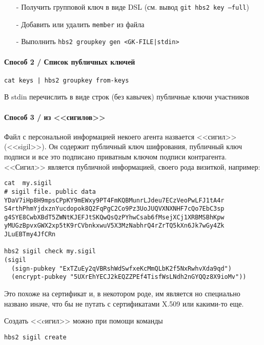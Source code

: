 \documentclass[11pt,a4paper]{article}
\begin{document}
\begin{itemize}
  \item[-] Получить групповой ключ в виде DSL (см. вывод \texttt{git hbs2 key --full})
  \item[-] Добавить или удалить \texttt{member} из файла
  \item[-] Выполнить \texttt{hbs2 groupkey gen <GK-FILE|stdin>}
\end{itemize}

\paragraph{Способ 2 / Список публичных ключей}

\begin{verbatim}
cat keys | hbs2 groupkey from-keys
\end{verbatim}

В stdin перечислить в виде строк (без кавычек) публичные ключи участников

\paragraph{Способ 3 / из <<сигилов>>}

Файл с персональной информацией некоего агента назвается <<сигил>> (<<sigil>>).
Он содержит публичный ключ шифрования, публичный ключ подписи и все это подписано
приватным ключом подписи контрагента. <<Сигил>> является публичной информацией,
своего рода визиткой, например:

\begin{verbatim}
cat  my.sigil
# sigil file. public data
YDaV7iHp8H9mpsCPpKY9mEWxy9PT4FmKQBMunrLJdeu7ECzVeoPwLFJ1tA4r
S4rthPhmYjdxznYucdopok8Q2FqPgC2Co9Pz3UoJUQVXNXNHF7cQo7EbC3sp
g4SYE8CwbXBdT5ZWNtKJEFJtSKQwQsQzPYhwCsab6fMsejXCj1XRBMSBhKpw
yMUGzBpvxGWX2xp5tK9rCVbnkxwuV5X3MzNabhrQ4rZrTQ5kXn6Jk7wGy4Zk
JLuEBTmy4JfCRn

hbs2 sigil check my.sigil
(sigil
  (sign-pubkey "ExTZuEy2qVBRshWdSwfxeKcMmQLbK2f5NxRwhvXda9qd")
  (encrypt-pubkey "5UXrEhYECJ2kEQZZPEf4TisfWsLNdh2nGYQQz8X9ioMv"))

\end{verbatim}

Это похоже на сертификат и, в некотором роде, им является но специально названо иначе, что бы не
путать с сертификатами X.509 или какими-то еще.

Создать <<cигил>> можно при помощи команды

\texttt{hbs2 sigil create}
\end{document}
